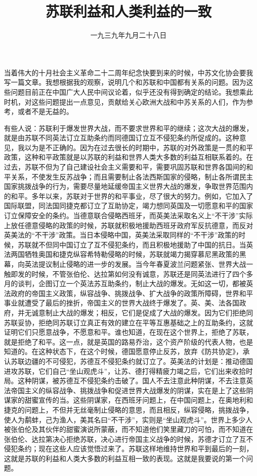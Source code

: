
\title{苏联利益和人类利益的一致}
\date{一九三九年九月二十八日}
\maketitle


当着伟大的十月社会主义革命二十二周年纪念快要到来的时候，中苏文化协会要我写一篇文章。我想根据我的观察，说明几个和苏联和中国都有关系的问题。因为这些问题目前正在中国广大人民中间议论着，似乎还没有得到确定的结论。我想乘此时机，对这些问题提出一点意见，贡献给关心欧洲大战和中苏关系的人们，作为参考，或者不是无益的。

有些人说：苏联利于爆发世界大战，而不要求世界和平的继续；这次大战的爆发，就是由苏联不同英法订立互助条约而同德国订立互不侵犯条约所促成的。这种意见，我以为是不正确的。因为在过去很长的时期中，苏联的对外政策是一贯的和平政策，这种和平政策就是以苏联的利益和世界人类大多数的利益互相联系着的。在过去，苏联不但为了自己建设社会主义需要和平，需要巩固苏联和世界各国间的和平关系，不使发生反苏战争；而且需要制止各法西斯国家的侵略，制止各所谓民主国家挑拨战争的行为，需要尽量地延缓帝国主义世界大战的爆发，争取世界范围内的和平。多年以来，苏联对于世界的和平事业，尽了很大的努力。例如，它加入了国际联盟，同法国同捷克都订立了互助协定，竭力想同英国及一切愿意和平的国家订立保障安全的条约。当德意联合侵略西班牙，而英美法采取名义上“不干涉”实际上放任德意侵略的政策的时候，苏联就积极地援助西班牙政府军反抗德意，而反对英美法的“不干涉”政策。当日本侵略中国，英美法采取同样的“不干涉”政策的时候，苏联就不但同中国订立了互不侵犯条约，而且积极地援助了中国的抗日。当英法两国牺牲奥国和捷克纵容希特勒侵略的时候，苏联就竭力揭穿慕尼黑政策的黑幕，向英法提议制止侵略的进一步的发展。当今年春夏波兰问题紧张、世界大战一触即发的时候，不管张伯伦、达拉第如何没有诚意，苏联还是同英法进行了四个多月的谈判，企图订立一个英法苏互助条约，制止大战的爆发。无如这一切，都被英法政府的帝国主义政策，纵容战争、挑拨战争、扩大战争的政策所障碍，世界和平事业就遭受了最后的挫折，帝国主义的世界大战终于爆发了。英、美、法各国政府，并无诚意制止大战的爆发；相反，它们是促成了大战的爆发。因为它们拒绝同苏联妥协，拒绝同苏联订立真正有效的建立在平等互惠基础之上的互助条约，这就证明它们只愿意战争，不愿意和平。谁也知道，在现在这个世界上，拒绝了苏联，就是拒绝了和平。这一点，就是英国的路易乔治，这个资产阶级的代表人物，也是知道的。在这种状态下，在这个时候，德国愿意停止反苏，放弃《防共协定》，承认苏联边疆的不可侵犯，苏德互不侵犯条约就订立了。英美法的计划是：推动德国进攻苏联，它们自己“坐山观虎斗”，让苏、德打得精疲力竭之后，它们出来收拾时局。这种阴谋，被苏德互不侵犯条约击破了。国人不去注意此种阴谋，不去注意英法帝国主义的纵容战争、挑拨战争和促进世界大战爆发的阴谋，实在是上了这些阴谋家的甜蜜宣传的当。这些阴谋家，在西班牙问题上，在中国问题上，在奥地利和捷克的问题上，不但并无丝毫制止侵略的意思，而且相反，纵容侵略，挑拨战争，使人为鹬蚌，己为渔人，美其名曰“不干涉”，实则是“坐山观虎斗”。世界上多少人被张伯伦及其伙伴的甜蜜演说所蒙蔽，而不知道他们笑里藏刀的可怕，而不知道在张伯伦、达拉第决心拒绝苏联，决心进行帝国主义战争的时候，苏德才订立了互不侵犯条约；现在这些人应该觉悟过来了。苏联这样地维持世界和平到最后的一刻，这就是苏联的利益和人类大多数的利益互相一致的表现。这就是我要说的第一个问题。

